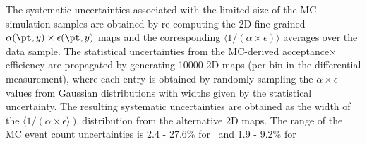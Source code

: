 
The systematic uncertainties associated with the limited size of the MC simulation samples are obtained by re-computing the 2D fine-grained $\alpha(\pt,y) \times \epsilon(\pt,y)$ maps and the corresponding $\langle 1 / (\alpha\!\times\!\epsilon)\rangle$ averages over the data sample.
The statistical uncertainties from the MC-derived acceptance$\times$efficiency
are propagated by generating 10000 2D maps (per bin in the differential measurement), where each entry is obtained by randomly sampling 
the $\alpha\!\times\!\epsilon$ values from Gaussian distributions with widths given by the statistical uncertainty. The resulting systematic
uncertainties are obtained as the width of the $\langle 1 /(\alpha\!\times\!\epsilon\rangle)$ distribution from the alternative 2D maps. 
The range of the MC event count uncertainties is 2.4 - 27.6\% for \PBzs\ and 1.9 - 9.2\% for \PB\


